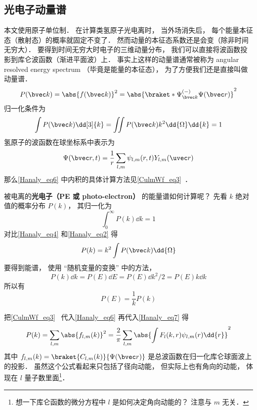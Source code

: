 

\subsection{光电子动量谱}

本文使用原子单位制． 在计算类氢原子光电离时， 当外场消失后， 每个能量本征态（散射态）的概率就固定不变了． 然而动量的本征态系数还是会变（除非时间无穷大）． 要得到时间无穷大时电子的三维动量分布， 我们可以直接将波函数投影到库仑波函数（渐进平面波）上． 事实上这样的动量谱通常被称为 angular resolved energy spectrum （毕竟是能量的本征态）， 为了方便我们还是直接叫做动量谱．
\begin{equation}\label{Hanaly_eq6}
P(\bvec k) = \abs{f(\bvec k)}^2 = \abs{\braket*{\Psi^{(-)}_{\bvec k}}{\Psi(\bvec r)}}^2
\end{equation}
归一化条件为
\begin{equation}\label{Hanaly_eq4}
\int P(\bvec k) \dd[3]{k} = \iint P(\bvec k) k^2\dd{\Omega}\dd{k} = 1
\end{equation}
氢原子的波函数在球坐标系中表示为
\begin{equation}
\Psi(\bvec r, t) = \frac{1}{r}\sum_{l,m} \psi_{l,m}(r, t) Y_{l,m}(\uvec r)
\end{equation}
那么\autoref{Hanaly_eq6} 中内积的具体计算方法见\autoref{CulmWf_eq3}~．

被电离的\textbf{光电子（PE 或 photo-electron）} 的能量谱如何计算呢？ 先看 $k$ 绝对值的概率分布 $P(k)$， 其归一化为
\begin{equation}\label{Hanaly_eq2}
\int_0^\infty P(k) \dd{k} = 1
\end{equation}
对比\autoref{Hanaly_eq4} 和\autoref{Hanaly_eq2} 得
\begin{equation}\label{Hanaly_eq7}
P(k) = k^2 \int P(\bvec k) \dd{\Omega}
\end{equation}
要得到能谱， 使用 “随机变量的变换” 中的方法，
\begin{equation}\label{Hanaly_eq1}
P(k)\dd{k} = P(E)\dd{E} = P(E)\dd{k^2/2} = P(E)k\dd{k}
\end{equation}
所以有
\begin{equation}
P(E) = \frac{1}{k}P(k)
\end{equation}

把\autoref{CulmWf_eq3}~ 代入\autoref{Hanaly_eq6} 再代入\autoref{Hanaly_eq7} 得
\begin{equation}
P(k) = \sum_{l,m} \abs{f_{l,m}(k)}^2 = \frac{2}{\pi} \sum_{l,m} \abs{\int F_l(k, r) \psi_{l,m}(r) \dd{r}}^2
\end{equation}
其中 $f_{l,m}(k) = \braket{C_{l,m}(k)}{\Psi(\bvec r)}$ 是总波函数在归一化库仑球面波上的投影． 虽然这个公式看起来只包括了径向动能， 但实际上也有角向的动能， 体现在 $l$ 量子数里面\footnote{想一下库仑函数的微分方程中 $l$ 是如何决定角向动能的？ 注意与 $m$ 无关．}．

